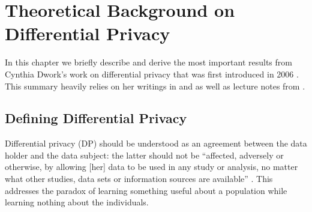 \section{Theoretical Background on Differential Privacy}\label{ch2}

In this chapter we briefly describe and derive the most important results from Cynthia Dwork's work on differential privacy that was first introduced in 2006 \parencite{dwork2006differential}. This summary heavily relies on her writings in \parencite{dwork2019differential} and \parencite{dwork2014algorithmic} as well as lecture notes from \parencite{lecture_CSE711}.

\subsection{Defining Differential Privacy}
Differential privacy (DP) should be understood as an agreement between the data holder and the data subject: the latter should not be ``affected, adversely or otherwise, by allowing [her] data to be used in any study or analysis, no matter what other studies, data sets or information sources are available'' \parencite{dwork2014algorithmic}. This addresses the paradox of learning something useful about a population while learning nothing about the individuals.


